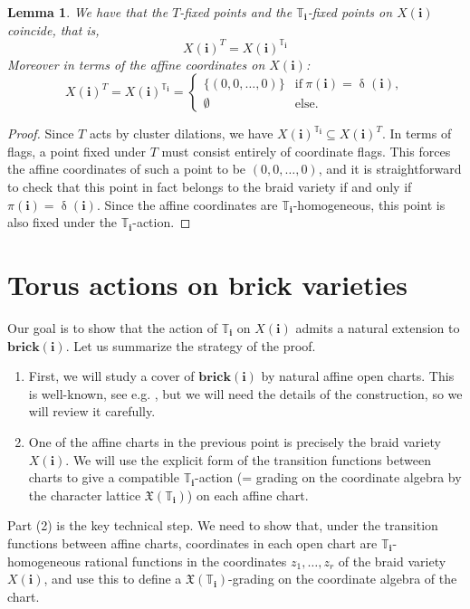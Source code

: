 \documentclass[a4paper, 11pt]{amsart}
\newcommand{\brick}{\mathbf{brick}}
\newcommand{\charlat}{\mathfrak{X}}
\newcommand{\word}[1]{\mathbf{#1}}
\DeclareMathOperator{\dem}{\delta}
\newcommand{\dil}[1]{\mathbb{T}_{#1}}
\newtheorem{lemma}[theorem]{Lemma}%
\theoremstyle{definition}
\begin{document}
\begin{lemma}\label{lem:fixed-points-braid} 
We have that the $T$-fixed points and the $\dil{\word{i}}$-fixed points on $X(\word{i})$ coincide, that is,
\[
X(\word{i})^{T} = X(\word{i})^{\dil{\word{i}}}
\]
Moreover in terms of the affine coordinates on $X(\word{i})$:
\[
X(\word{i})^{T} = X(\word{i})^{\dil{\word{i}}} = \begin{cases} \{(0, 0, \dots, 0)\} & \text{if} \: \pi(\word{i}) = \dem(\word{i}), \\
\emptyset & \text{else}. \end{cases} 
\]
\end{lemma}
\begin{proof}
Since $T$ acts by cluster dilations, we have $X(\word{i})^{\dil{\word{i}}} \subseteq X(\word{i})^{T}$. In terms of flags, a point fixed under $T$ must consist entirely of coordinate flags. This forces the affine coordinates of such a point to be $(0,0, \dots, 0)$, and it is straightforward to check that this point in fact belongs to the braid variety if and only if $\pi(\word{i}) = \dem(\word{i})$. Since the affine coordinates are $\dil{\word{i}}$-homogeneous, this point is also fixed under the $\dil{\word{i}}$-action. 
\end{proof}

\section{Torus actions on brick varieties}\label{sec:torus-actions-bricks}
Our goal is to show that the action of $\dil{\word{i}}$ on $X(\word{i})$ admits a natural extension to $\brick(\word{i})$. Let us summarize the strategy of the proof. 
\begin{enumerate}
    \item First, we will study a cover of $\brick(\word{i})$ by natural affine open charts. This is well-known, see e.g. \cite{cheah}, but we will need the details of the construction, so we will review it carefully.
    \item One of the affine charts in the previous point is precisely the braid variety $X(\word{i})$. We will use the explicit form of the transition functions between charts to give a compatible $\dil{\word{i}}$-action (= grading on the coordinate algebra by the character lattice $\charlat(\dil{\word{i}})$) on each affine chart. 
\end{enumerate}
Part (2) is the key technical step. We need to show that, under the transition functions between affine charts, coordinates in each open chart are $\dil{\word{i}}$-homogeneous rational functions in the coordinates $z_1, \dots, z_r$ of the braid variety $X(\word{i})$, and use this to define a $\charlat(\dil{\word{i}})$-grading on the coordinate algebra of the chart.
\end{document}
